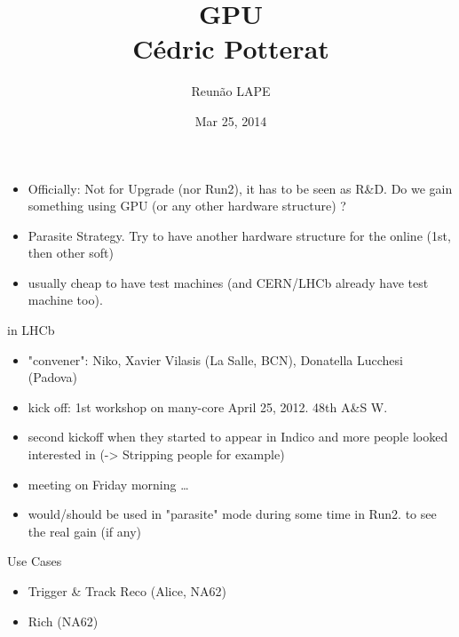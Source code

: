 \documentclass[compress,10pt]{beamer}
\title{\vspace{-1.0cm}GPU\\
  \vspace{2.7cm}
  \small{C\'edric Potterat}
}
\subtitle{\vspace{1.45cm}\small{Reun\~{a}o LAPE\vspace{0.7cm}}}
\author{\scriptsize{Mar 25, 2014}}
\begin{document}

\maketitle




\begin{frame}
  \frametitle{} 
   \begin{block}{}
  \begin{itemize}
   \item Officially: Not for Upgrade (nor Run2), it has to be seen as R\&D. Do we gain something using GPU (or any other hardware structure) ?
    \item Parasite Strategy. Try to have another hardware structure for the online (1st, then other soft) 
    \item usually cheap to have test machines (and CERN/LHCb already have test machine too).
       \end{itemize}
  \end{block}

 \begin{block}{in LHCb}
  \begin{itemize}
   \item "convener": Niko, Xavier Vilasis (La Salle, BCN), Donatella Lucchesi (Padova)
   \item kick off: 1st workshop on many-core April 25, 2012. 48th A\&S W. 
   \item second kickoff when they started to appear in Indico and more people looked interested in (-> Stripping people for example)
   \item meeting on Friday morning \ldots
   \item would/should be used in "parasite" mode during some time in Run2. to see the real gain (if any)
       \end{itemize}
  \end{block}


  \begin{block}{Use Cases}
  \begin{itemize}
   \item Trigger \& Track Reco (Alice, NA62)
   \item Rich (NA62)
       \end{itemize}
   \end{block}

\end{frame}
\end{document}
